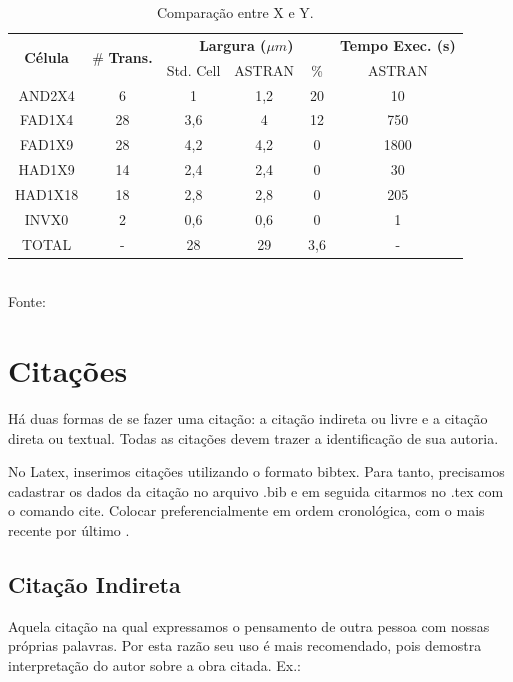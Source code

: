 \begin{table}
    \centering
    \caption{Comparação entre X e Y.}
    \begin{tabular}{c|c|c|c|c|c} \hline
        \multirow{2}{*}{\textbf{Célula}} & \multirow{2}{*}{\# \bf{Trans.}} & \multicolumn{3}{|c|}{\bf{Largura} ($\mu m$)} & \bf{Tempo Exec. (s)}\\ \cline{3-6} 
         &  & Std. Cell & ASTRAN & \% & ASTRAN \\ \hline \hline
        AND2X4& 6 & 1 & 1,2 & 20 & 10 \\ \hline
        FAD1X4& 28 & 3,6 & 4 & 12 & 750\\ \hline
        FAD1X9& 28 & 4,2 & 4,2 & 0 & 1800\\ \hline
        HAD1X9& 14 & 2,4 & 2,4 & 0 & 30\\ \hline
        HAD1X18& 18 & 2,8 & 2,8 & 0 & 205\\ \hline
        INVX0 & 2 & 0,6 & 0,6 & 0 & 1\\ \hline
        TOTAL& - & 28 & 29 & 3,6 &-\\ \hline
    \end{tabular}
    {\\ Fonte: \cite{artigo}}
    \label{tab:comp1}
\end{table}

\section{Citações}
Há duas formas de se fazer uma citação: a citação indireta ou livre e a citação direta ou textual. Todas as citações devem trazer a identificação de sua autoria.

No Latex, inserimos citações utilizando o formato bibtex. Para tanto, precisamos cadastrar os dados da citação no arquivo .bib e em seguida citarmos no .tex com o comando cite. Colocar preferencialmente em ordem cronológica, com o mais recente por último \cite{livro, artigo, tese, capitulo, paper, site, apresentacao}.

\subsection{Citação Indireta}
Aquela citação na qual expressamos o pensamento de outra pessoa com nossas próprias palavras. Por esta razão seu uso é mais recomendado, pois demostra interpretação do autor sobre a obra citada. Ex.:

